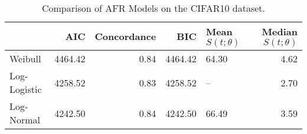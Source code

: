 \begin{table*}
\centering
\caption{Comparison of AFR Models on the CIFAR10 dataset.}
\label{tab:cifar}
\begin{tabular}{lrrrlr}
\toprule
 & AIC & Concordance & BIC & Mean $S(t;\theta)$ & Median $S(t;\theta)$ \\
\midrule
Weibull & 4464.42 & 0.84 & 4464.42 & 64.30 & 4.62 \\
Log-Logistic & 4258.52 & 0.83 & 4258.52 & -- & 2.70 \\
Log-Normal & 4242.50 & 0.84 & 4242.50 & 66.49 & 3.59 \\
\bottomrule
\end{tabular}
\end{table*}
